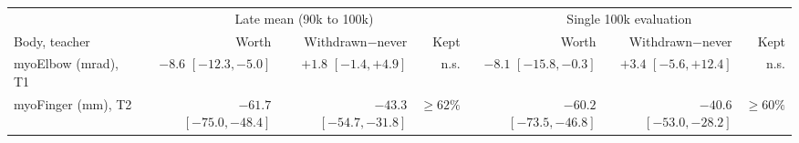 \begin{tabular}{@{}lrrrrrr@{}}
\toprule
 & \multicolumn{3}{c}{Late mean (90k to 100k)} & \multicolumn{3}{c}{Single 100k evaluation}\\
\cmidrule(lr){2-4}\cmidrule(lr){5-7}
Body, teacher & Worth & Withdrawn$-$never & Kept & Worth & Withdrawn$-$never & Kept\\
\midrule
myoElbow (mrad), T1 & $\mathbf{-8.6}$ {\scriptsize$[-12.3, -5.0]$} & $+1.8$ {\scriptsize$[-1.4, +4.9]$} & n.s. & $\mathbf{-8.1}$ {\scriptsize$[-15.8, -0.3]$} & $+3.4$ {\scriptsize$[-5.6, +12.4]$} & n.s. \\
myoFinger (mm), T2 & $\mathbf{-61.7}$ {\scriptsize$[-75.0, -48.4]$} & $\mathbf{-43.3}$ {\scriptsize$[-54.7, -31.8]$} & $\geq 62\%$ & $\mathbf{-60.2}$ {\scriptsize$[-73.5, -46.8]$} & $\mathbf{-40.6}$ {\scriptsize$[-53.0, -28.2]$} & $\geq 60\%$ \\
\bottomrule
\end{tabular}
